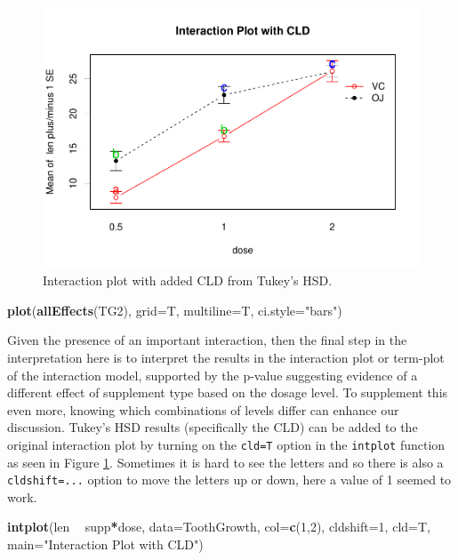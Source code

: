 \documentclass[]{book}
\newenvironment{Shaded}{\begin{snugshade}}{\end{snugshade}}
\newcommand{\KeywordTok}[1]{\textcolor[rgb]{0.13,0.29,0.53}{\textbf{#1}}}
\newcommand{\DataTypeTok}[1]{\textcolor[rgb]{0.13,0.29,0.53}{#1}}
\newcommand{\DecValTok}[1]{\textcolor[rgb]{0.00,0.00,0.81}{#1}}
\newcommand{\StringTok}[1]{\textcolor[rgb]{0.31,0.60,0.02}{#1}}
\newcommand{\OperatorTok}[1]{\textcolor[rgb]{0.81,0.36,0.00}{\textbf{#1}}}
\newcommand{\NormalTok}[1]{#1}
\theoremstyle{definition}
\theoremstyle{definition}
\theoremstyle{remark}
\begin{document}
\begin{figure}
\centering
\includegraphics{04-twoWayAnova_files/figure-latex/Figure4-11-1.pdf}
\caption{\label{fig:Figure4-11}Interaction plot with added CLD from Tukey's HSD.}
\end{figure}

\begin{Shaded}
\begin{Highlighting}[]
\KeywordTok{plot}\NormalTok{(}\KeywordTok{allEffects}\NormalTok{(TG2), }\DataTypeTok{grid=}\NormalTok{T, }\DataTypeTok{multiline=}\NormalTok{T, }\DataTypeTok{ci.style=}\StringTok{"bars"}\NormalTok{)}
\end{Highlighting}
\end{Shaded}

Given the presence of an important interaction, then the final step in
the interpretation here is to interpret the results in the interaction
plot or term-plot of the interaction model, supported by the p-value
suggesting evidence of a different effect of supplement type based on
the dosage level. To supplement this even more, knowing which
combinations of levels differ can enhance our discussion. Tukey's HSD
results (specifically the CLD) can be added to the original interaction
plot by turning on the \texttt{cld=T} option in the \texttt{intplot}
function as seen in Figure \ref{fig:Figure4-11}. Sometimes it is hard to
see the letters and so there is also a \texttt{cldshift=...} option to
move the letters up or down, here a value of 1 seemed to work.

\begin{Shaded}
\begin{Highlighting}[]
\KeywordTok{intplot}\NormalTok{(len }\OperatorTok{~}\StringTok{ }\NormalTok{supp}\OperatorTok{*}\NormalTok{dose, }\DataTypeTok{data=}\NormalTok{ToothGrowth, }\DataTypeTok{col=}\KeywordTok{c}\NormalTok{(}\DecValTok{1}\NormalTok{,}\DecValTok{2}\NormalTok{), }\DataTypeTok{cldshift=}\DecValTok{1}\NormalTok{,}
        \DataTypeTok{cld=}\NormalTok{T, }\DataTypeTok{main=}\StringTok{"Interaction Plot with CLD"}\NormalTok{)}
\end{Highlighting}
\end{Shaded}
\end{document}

